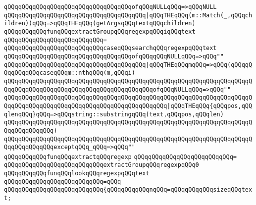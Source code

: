 \verb|qQQqqQQqqQQqqQQqqQQqqQQqqQQqqQQqqQQqofqQQqNULLqQQq=>qQQqNULL|\newline
\newline
\verb|qQQqqQQqqQQqqQQqqQQqqQQqqQQqqQQqqQQqqQQq|\verb#|qQQqTHEqQQq(m::Match(_,qQQqchildren))qQQq=>qQQqTHEqQQq(getArgsqQQqtextqQQqchildren)#\newline
\newline
\verb|qQQqqQQqqQQqfunqQQqextractGroupqQQqregexpqQQqiqQQqtext|\newline
\verb|qQQqqQQqqQQqqQQqqQQqqQQqqQQq=|\newline
\verb|qQQqqQQqqQQqqQQqqQQqqQQqqQQqcaseqQQqsearchqQQqregexpqQQqtext|\newline
\newline
\verb|qQQqqQQqqQQqqQQqqQQqqQQqqQQqqQQqqQQqofqQQqqQQqNULLqQQq=>qQQq""|\newline
\newline
\verb|qQQqqQQqqQQqqQQqqQQqqQQqqQQqqQQqqQQqqQQq|\verb#|qQQqTHEqQQqmqQQq=>qQQq(qQQqqQQqqQQqqQQqcaseqQQqm::nthqQQq(m,qQQqi)#\newline
\verb|qQQqqQQqqQQqqQQqqQQqqQQqqQQqqQQqqQQqqQQqqQQqqQQqqQQqqQQqqQQqqQQqqQQqqQQqqQQqqQQqqQQqqQQqqQQqqQQqqQQqqQQqqQQqqQQqofqQQqNULLqQQq=>qQQq""|\newline
\verb|qQQqqQQqqQQqqQQqqQQqqQQqqQQqqQQqqQQqqQQqqQQqqQQqqQQqqQQqqQQqqQQqqQQqqQQqqQQqqQQqqQQqqQQqqQQqqQQqqQQqqQQqqQQqqQQqqQQq|\verb#|qQQqTHEqQQq{qQQqpos,qQQqlenqQQq}qQQq=>qQQqstring::substringqQQq(text,qQQqpos,qQQqlen)#\newline
\verb|qQQqqQQqqQQqqQQqqQQqqQQqqQQqqQQqqQQqqQQqqQQqqQQqqQQqqQQqqQQqqQQqqQQqqQQqqQQqqQQqqQQq)|\newline
\verb|qQQqqQQqqQQqqQQqqQQqqQQqqQQqqQQqqQQqqQQqqQQqqQQqqQQqqQQqqQQqqQQqqQQqqQQqqQQqqQQqqQQqexceptqQQq_qQQq=>qQQq""|\newline
\newline
\verb|qQQqqQQqqQQqfunqQQqextractqQQqregexp|\newline
\verb|qQQqqQQqqQQqqQQqqQQqqQQqqQQq=|\newline
\verb|qQQqqQQqqQQqqQQqqQQqqQQqqQQqextractGroupqQQqregexpqQQq0|\newline
\newline
\verb|qQQqqQQqqQQqfunqQQqlookqQQqregexpqQQqtext|\newline
\verb|qQQqqQQqqQQqqQQqqQQqqQQqqQQq=qQQq|\newline
\verb|qQQqqQQqqQQqqQQqqQQqqQQqqQQq{qQQqqQQqqQQqnqQQq=qQQqqQQqqQQqsizeqQQqtext;|\newline
\newline

